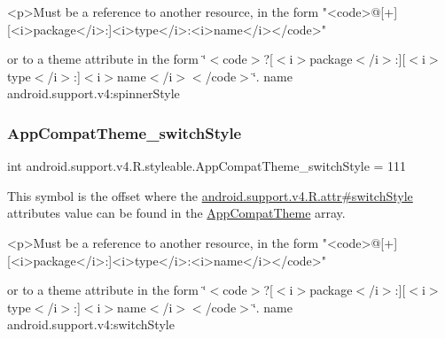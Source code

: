 \begin{DoxyVerb}      <p>Must be a reference to another resource, in the form "<code>@[+][<i>package</i>:]<i>type</i>:<i>name</i></code>"
\end{DoxyVerb}
 or to a theme attribute in the form \char`\"{}$<$code$>$?\mbox{[}$<$i$>$package$<$/i$>$\+:\mbox{]}\mbox{[}$<$i$>$type$<$/i$>$\+:\mbox{]}$<$i$>$name$<$/i$>$$<$/code$>$\char`\"{}.  name android.\+support.\+v4\+:spinner\+Style \mbox{\label{classandroid_1_1support_1_1v4_1_1R_1_1styleable_a88c6ebdb5e64556c13f05c1525c8ef99}} 
\subsubsection{\texorpdfstring{App\+Compat\+Theme\+\_\+switch\+Style}{AppCompatTheme\_switchStyle}}
{\footnotesize\ttfamily int android.\+support.\+v4.\+R.\+styleable.\+App\+Compat\+Theme\+\_\+switch\+Style = 111\hspace{0.3cm}{\ttfamily [static]}}

This symbol is the offset where the \hyperlink{classandroid_1_1support_1_1v4_1_1R_1_1attr_a80e91f4f034c963ef017cfc248a69164}{android.\+support.\+v4.\+R.\+attr\#switch\+Style} attribute\textquotesingle{}s value can be found in the \hyperlink{classandroid_1_1support_1_1v4_1_1R_1_1styleable_ac07ebbe62ed977f6dcaadc6397840ace}{App\+Compat\+Theme} array.

\begin{DoxyVerb}      <p>Must be a reference to another resource, in the form "<code>@[+][<i>package</i>:]<i>type</i>:<i>name</i></code>"
\end{DoxyVerb}
 or to a theme attribute in the form \char`\"{}$<$code$>$?\mbox{[}$<$i$>$package$<$/i$>$\+:\mbox{]}\mbox{[}$<$i$>$type$<$/i$>$\+:\mbox{]}$<$i$>$name$<$/i$>$$<$/code$>$\char`\"{}.  name android.\+support.\+v4\+:switch\+Style \mbox{\label{classandroid_1_1support_1_1v4_1_1R_1_1styleable_a946d0cdb84dc252db74ba6bd92a139c3}} 
